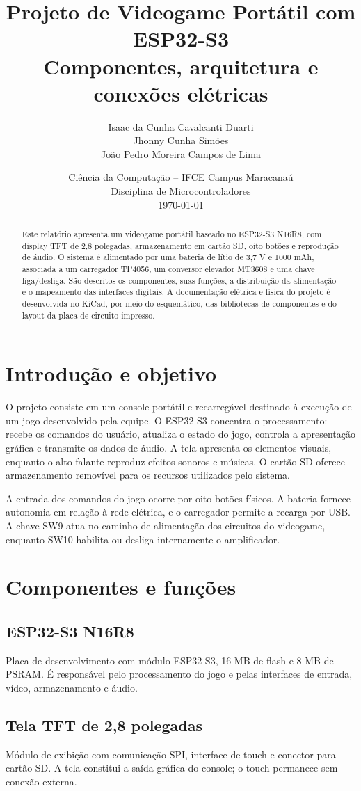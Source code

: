 \documentclass[12pt,a4paper]{article}
\title{Projeto de Videogame Portátil com ESP32-S3\\\large Componentes, arquitetura e conexões elétricas}
\author{Isaac da Cunha Cavalcanti Duarti \\ Jhonny Cunha Simões \\ João Pedro Moreira Campos de Lima}
\date{Ciência da Computação -- IFCE Campus Maracanaú\\Disciplina de Microcontroladores\\\today}
\begin{document}
\maketitle
\begin{abstract}
  Este relatório apresenta um videogame portátil baseado no ESP32-S3 N16R8, com display TFT de 2,8 polegadas, armazenamento em cartão SD, oito botões e reprodução de áudio. O sistema é alimentado por uma bateria de lítio de 3,7 V e 1000 mAh, associada a um carregador TP4056, um conversor elevador MT3608 e uma chave liga/desliga. São descritos os componentes, suas funções, a distribuição da alimentação e o mapeamento das interfaces digitais. A documentação elétrica e física do projeto é desenvolvida no KiCad, por meio do esquemático, das bibliotecas de componentes e do layout da placa de circuito impresso.
\end{abstract}

\section{Introdução e objetivo}
O projeto consiste em um console portátil e recarregável destinado à execução de um jogo desenvolvido pela equipe. O ESP32-S3 concentra o processamento: recebe os comandos do usuário, atualiza o estado do jogo, controla a apresentação gráfica e transmite os dados de áudio. A tela apresenta os elementos visuais, enquanto o alto-falante reproduz efeitos sonoros e músicas. O cartão SD oferece armazenamento removível para os recursos utilizados pelo sistema.

A entrada dos comandos do jogo ocorre por oito botões físicos. A bateria fornece autonomia em relação à rede elétrica, e o carregador permite a recarga por USB. A chave SW9 atua no caminho de alimentação dos circuitos do videogame, enquanto SW10 habilita ou desliga internamente o amplificador.

\section{Componentes e funções}
\subsection{ESP32-S3 N16R8}
Placa de desenvolvimento com módulo ESP32-S3, 16 MB de flash e 8 MB de PSRAM. É responsável pelo processamento do jogo e pelas interfaces de entrada, vídeo, armazenamento e áudio.

\subsection{Tela TFT de 2,8 polegadas}
Módulo de exibição com comunicação SPI, interface de touch e conector para cartão SD. A tela constitui a saída gráfica do console; o touch permanece sem conexão externa.
\end{document}
